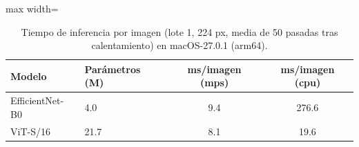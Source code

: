 \begin{table}[t]
\caption{Tiempo de inferencia por imagen (lote 1, 224 px, media de 50 pasadas tras calentamiento) en macOS-27.0.1 (arm64).}
\label{tab:inference}
\centering
\begin{adjustbox}{max width=\linewidth}
\begin{tabular}{llcc}
\toprule
Modelo & Parámetros (M) & ms/imagen (mps) & ms/imagen (cpu) \\
\midrule
EfficientNet-B0 & 4.0 & 9.4 & 276.6 \\
ViT-S/16 & 21.7 & 8.1 & 19.6 \\
\bottomrule
\end{tabular}
\end{adjustbox}
\end{table}
